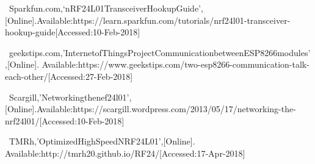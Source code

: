 \begin{thebibliography}{}
~Sparkfun.com,`nRF24L01TransceiverHookupGuide',[Online].Available:https://learn.sparkfun.com/tutorials/nrf24l01-transceiver-hookup-guide[Accessed:10-Feb-2018]

~geekstips.com,'InternetofThingsProjectCommunicationbetweenESP8266modules',[Online]. Available:https://www.geekstips.com/two-esp8266-communication-talk-each-other/[Accessed:27-Feb-2018]

~Scargill,'Networkingthenef24l01',[Online].Available:https://scargill.wordpress.com/2013/05/17/networking-the-nrf24l01/[Accessed:10-Feb-2018]

~TMRh,'OptimizedHighSpeedNRF24L01',[Online]. Available:http://tmrh20.github.io/RF24/[Accessed:17-Apr-2018]

\end{thebibliography}

